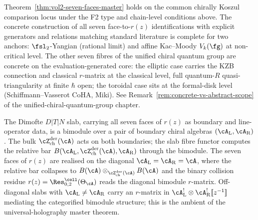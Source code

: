 \begin{remark}
\label{rem:dnp-master-concrete-vs-abstract}
Theorem~\ref{thm:vol2-seven-faces-master} holds on the common
chirally Koszul comparison locus under the F2 type and
chain-level conditions above. The concrete construction of all
seven face-to-$r(z)$ identifications with explicit generators and
relations matching standard literature is complete for two
anchors: $\fsl_{2}$-Yangian (rational limit) and affine
Kac--Moody $V_k(\fg)$ at non-critical level. The other seven
fibres of the unified chiral quantum group are concrete on the
evaluation-generated core: the elliptic case carries the KZB
connection and classical $r$-matrix at the classical level,
full quantum-$R$ quasi-triangularity at finite $\hbar$ open; the
toroidal case sits at the formal-disk level
(Schiffmann--Vasserot CoHA, Miki). See
Remark~\ref{rem:concrete-vs-abstract-scope} of the
unified-chiral-quantum-group chapter.
\end{remark}

\begin{remark}
\label{rem:dnp-master-slab-bimodule}
The Dimofte $D|T|N$ slab, carrying all seven faces of $r(z)$ as
boundary and line-operator data, is a bimodule over a pair of
boundary chiral algebras
$(\cA_{\mathrm{L}}, \cA_{\mathrm{R}})$. The bulk
$\cZ^{\mathrm{der}}_{\mathrm{ch}}(\cA)$ acts on both boundaries;
the slab fibre functor computes the relative bar
$B(\cA_{\mathrm{L}}, \cZ^{\mathrm{der}}_{\mathrm{ch}}(\cA),
\cA_{\mathrm{R}})$ through the bimodule. The seven faces of
$r(z)$ are realised on the diagonal
$\cA_{\mathrm{L}} = \cA_{\mathrm{R}} = \cA$, where the relative
bar collapses to
$B(\cA)\otimes_{\cZ^{\mathrm{der}}_{\mathrm{ch}}(\cA)} B(\cA)$
and the binary collision residue
$r(z) = \Res^{\coll}_{0,2}(\Theta_{\cA})$ reads the diagonal
bimodule $r$-matrix. Off-diagonal slabs with
$\cA_{\mathrm{L}} \neq \cA_{\mathrm{R}}$ carry an $r$-matrix in
$\cA_{\mathrm{L}}^{!} \otimes \cA_{\mathrm{R}}^{!}[\![z^{-1}]\!]$
mediating the categorified bimodule structure; this is the
ambient of the universal-holography master theorem.
\end{remark}

